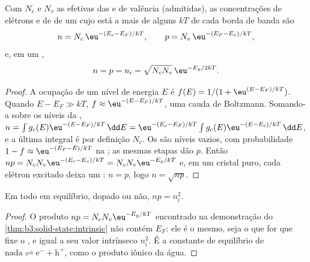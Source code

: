 \begin{theorem}\label{thm:b3:solid-state:intrinsic}
Com $N_c$ e $N_v$ as  efetivas das  e de
valência (admitidas), as concentrações de elétrons e de  de um 
cujo  está a mais de alguns $kT$ de cada borda de banda são
\[
  n = N_c\,\eu^{-(E_c - E_F)/kT}, \qquad p = N_v\,\eu^{-(E_F - E_v)/kT},
\]
e, em um ,
\[
  n = p = n_i = \sqrt{N_cN_v}\,\eu^{-E_g/2kT}.
\]
\end{theorem}

\begin{proof}
A ocupação de um nível de energia $E$ é $f(E) = 1/(1 + \eu^{(E - E_F)/kT})$. Quando
$E - E_F \gg kT$, $f \approx \eu^{-(E - E_F)/kT}$, uma cauda de Boltzmann. Somando-a sobre os níveis da , $n = \int g_c(E)\eu^{-(E - E_F)/kT}\,\dd E = \eu^{-(E_c - E_F)/kT}\int g_c(E)\eu^{-(E - E_c)/kT}\,\dd E$, e a última integral é por
definição $N_c$. Os  são níveis vazios, com probabilidade $1 - f \approx \eu^{-(E_F - E)/kT}$ na
; as mesmas etapas dão $p$. Então $np = N_cN_v\eu^{-(E_c - E_v)/kT} = N_cN_v\eu^{-E_g/kT}$ e, em um cristal puro,
cada elétron excitado deixa um : $n = p$, logo $n = \sqrt{np}$.
\end{proof}

\begin{proposition}\label{prop:b3:solid-state:mass-action}
Em todo  em equilíbrio, dopado ou não, $np = n_i^2$.
\end{proposition}

\begin{proof}
O produto $np = N_cN_v\eu^{-E_g/kT}$ encontrado na demonstração do
\cref{thm:b3:solid-state:intrinsic} não contém $E_F$: ele é o mesmo, seja o que for que
fixe o , e igual a seu valor intrínseco $n_i^2$. É a
constante de equilíbrio de $\text{nada} \rightleftharpoons \mathrm e^- + \mathrm h^+$, como o produto iônico da água.
\end{proof}

